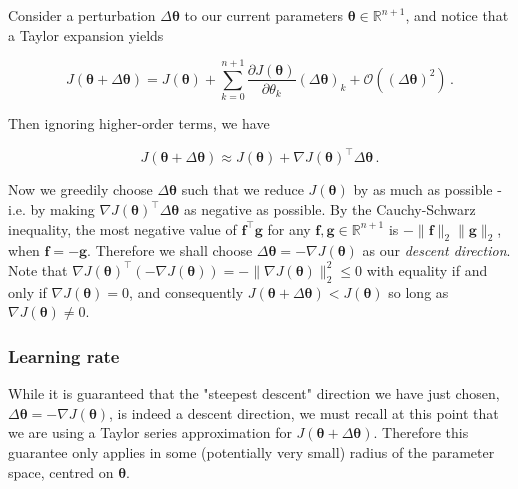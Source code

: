 \documentclass{article}[11pt]
\begin{document}
            Consider a perturbation $\Delta \boldsymbol{\theta}$ to our current parameters $\boldsymbol{\theta} \in \mathbb{R}^{n+1}$, and notice that a Taylor expansion yields
            
            $$
            J(\boldsymbol{\theta} + \Delta \boldsymbol{\theta}) = J(\boldsymbol{\theta}) + \sum_{k=0}^{n+1} \frac{\partial J(\boldsymbol{\theta})}{\partial \theta_k} (\Delta \boldsymbol{\theta})_k + \mathcal{O} ((\Delta \boldsymbol{\theta})^2) \,.
            $$
            
            Then ignoring higher-order terms, we have
            
            $$
            J(\boldsymbol{\theta} + \Delta \boldsymbol{\theta}) \approx J(\boldsymbol{\theta}) + \nabla J(\boldsymbol{\theta})^\top \Delta \boldsymbol{\theta} \,.
            $$
            
            Now we greedily choose $\Delta \boldsymbol{\theta}$ such that we reduce $J(\boldsymbol{\theta})$ by as much as possible - i.e. by making $\nabla J(\boldsymbol{\theta})^\top \Delta \boldsymbol{\theta}$ as negative as possible. By the Cauchy-Schwarz inequality, the most negative value of $\mathbf{f}^\top \mathbf{g}$ for any $\mathbf{f}, \mathbf{g} \in \mathbb{R}^{n+1}$ is $- \lVert \mathbf{f} \rVert_2 \lVert \mathbf{g} \rVert_2$, when $\mathbf{f} = -\mathbf{g}$. Therefore we shall choose $\Delta \boldsymbol{\theta} = - \nabla J(\boldsymbol{\theta})$ as our \textit{descent direction}. Note that $\nabla J(\boldsymbol{\theta})^\top (- \nabla J(\boldsymbol{\theta})) = -\lVert \nabla J(\boldsymbol{\theta}) \rVert_2^2 \leq 0$ with equality if and only if $\nabla J(\boldsymbol{\theta}) = 0$, and consequently $J(\boldsymbol{\theta} + \Delta \boldsymbol{\theta}) < J(\boldsymbol{\theta})$ so long as $\nabla J(\boldsymbol{\theta}) \neq 0$.
        
    
    
        \subsubsection{Learning rate}
            
            While it is guaranteed that the "steepest descent" direction we have just chosen, $\Delta \boldsymbol{\theta} = - \nabla J(\boldsymbol{\theta})$, is indeed a descent direction, we must recall at this point that we are using a Taylor series approximation for $J(\boldsymbol{\theta} + \Delta \boldsymbol{\theta})$. Therefore this guarantee only applies in some (potentially very small) radius of the parameter space, centred on $\boldsymbol{\theta}$.
            
\end{document}
